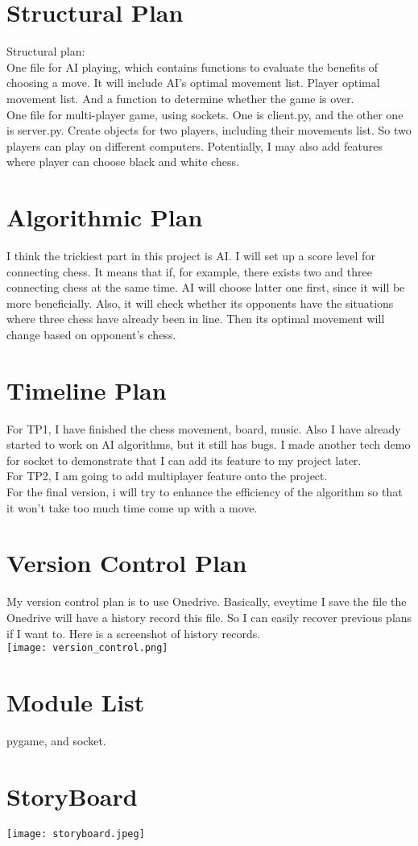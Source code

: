 \documentclass[12pt]{article}
\begin{document}
\section{Structural Plan}
Structural plan: \\
One file for AI playing, which contains functions to evaluate the benefits of choosing a move. It will include AI's optimal movement list. Player optimal movement list. And a function to determine whether the game is over.\\

One file for multi-player game, using sockets. One is client.py, and the other one is server.py. Create objects for two players, including their movements list. So two players can play on different computers. Potentially, I may also add features where player can choose black and white chess.\\

\section{Algorithmic Plan}
I think the trickiest part in this project is AI. I will set up a score level for connecting chess. It means that if, for example, there exists two and three connecting chess at the same time. AI will choose latter one first, since it will be more beneficially. Also, it will check whether its opponents have the situations where three chess have already been in line. Then its optimal movement will change based on opponent's chess. 

\section{Timeline Plan}
For TP1, I have finished the chess movement, board, music. Also I have already started to work on AI algorithms, but it still has bugs. I made another tech demo for socket to demonstrate that I can add its feature to my project later.\\
For TP2, I am going to add multiplayer feature onto the project.\\
For the final version, i will try to enhance the efficiency of the algorithm so that it won't take too much time come up with a move. 

\section{Version Control Plan}
My version control plan is to use Onedrive. Basically, eveytime I save the file the Onedrive will have a history record this file. So I can easily recover previous plans if I want to. Here is a screenshot of history records.\\

\texttt{[image: version\_control.png]}

\section{Module List}
pygame, and socket.

\section{StoryBoard}

\texttt{[image: storyboard.jpeg]}
\end{document}
